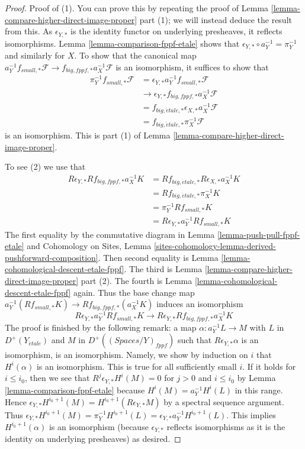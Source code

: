 \documentclass{stacks-project}
\theoremstyle{plain}
\theoremstyle{definition}
\theoremstyle{remark}
\numberwithin{equation}{subsection}
\def\etale{{\acute{e}tale}}
\begin{document}
\begin{proof}
Proof of (1). You can prove this by repeating the proof of
Lemma \ref{lemma-compare-higher-direct-image-proper} part (1);
we will instead deduce the result from this.
As $\epsilon_{Y, *}$ is the identity functor on underlying presheaves,
it reflects isomorphisms. Lemma \ref{lemma-comparison-fppf-etale}
shows that $\epsilon_{Y, *} \circ a_Y^{-1} = \pi_Y^{-1}$
and similarly for $X$. To show that the canonical map
$a_Y^{-1}f_{small, *}\mathcal{F} \to f_{big, fppf, *}a_X^{-1}\mathcal{F}$
is an isomorphism, it suffices to show that
\begin{align*}
\pi_Y^{-1}f_{small, *}\mathcal{F}
& =
\epsilon_{Y, *}a_Y^{-1}f_{small, *}\mathcal{F} \\
& \to 
\epsilon_{Y, *}f_{big, fppf, *}a_X^{-1}\mathcal{F} \\
& =
f_{big, \etale, *} \epsilon_{X, *}a_X^{-1}\mathcal{F} \\
& =
f_{big, \etale, *}\pi_X^{-1}\mathcal{F}
\end{align*}
is an isomorphism. This is part
(1) of Lemma \ref{lemma-compare-higher-direct-image-proper}.

\medskip\noindent
To see (2) we use that
\begin{align*}
R\epsilon_{Y, *}Rf_{big, fppf, *}a_X^{-1}K
& =
Rf_{big, \etale, *}R\epsilon_{X, *}a_X^{-1}K \\
& =
Rf_{big, \etale, *}\pi_X^{-1}K \\
& =
\pi_Y^{-1}Rf_{small, *}K \\
& =
R\epsilon_{Y, *} a_Y^{-1}Rf_{small, *}K
\end{align*}
The first equality by the commutative diagram in
Lemma \ref{lemma-push-pull-fppf-etale}
and Cohomology on Sites, Lemma
\ref{sites-cohomology-lemma-derived-pushforward-composition}.
Then second equality is Lemma \ref{lemma-cohomological-descent-etale-fppf}.
The third is
Lemma \ref{lemma-compare-higher-direct-image-proper} part (2).
The fourth is Lemma \ref{lemma-cohomological-descent-etale-fppf} again.
Thus the base change map
$a_Y^{-1}(Rf_{small, *}K) \to Rf_{big, fppf, *}(a_X^{-1}K)$
induces an isomorphism
$$
R\epsilon_{Y, *}a_Y^{-1}Rf_{small, *}K \to
R\epsilon_{Y, *}Rf_{big, fppf, *}a_X^{-1}K
$$
The proof is finished by the following remark: a map
$\alpha : a_Y^{-1}L \to M$ with $L$ in $D^+(Y_\etale)$
and $M$ in $D^+((\textit{Spaces}/Y)_{fppf})$ such that
$R\epsilon_{Y, *}\alpha$ is an isomorphism, is an isomorphism. Namely, 
we show by induction on $i$ that $H^i(\alpha)$ is an isomorphism.
This is true for all sufficiently small $i$.
If it holds for $i \leq i_0$, then we see that
$R^j\epsilon_{Y, *}H^i(M) = 0$ for $j > 0$ and $i \leq i_0$
by Lemma \ref{lemma-comparison-fppf-etale}
because $H^i(M) = a_Y^{-1}H^i(L)$ in this range.
Hence $\epsilon_{Y, *}H^{i_0 + 1}(M) = H^{i_0 + 1}(R\epsilon_{Y, *}M)$
by a spectral sequence argument.
Thus $\epsilon_{Y, *}H^{i_0 + 1}(M) = \pi_Y^{-1}H^{i_0 + 1}(L) =
\epsilon_{Y, *}a_Y^{-1}H^{i_0 + 1}(L)$.
This implies $H^{i_0 + 1}(\alpha)$ is an isomorphism
(because $\epsilon_{Y, *}$ reflects isomorphisms as it is the
identity on underlying presheaves) as desired.
\end{proof}
\end{document}
